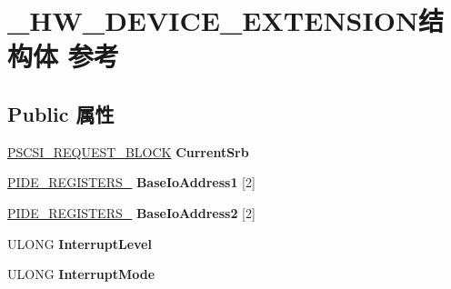 \hypertarget{struct___h_w___d_e_v_i_c_e___e_x_t_e_n_s_i_o_n}{}\section{\+\_\+\+H\+W\+\_\+\+D\+E\+V\+I\+C\+E\+\_\+\+E\+X\+T\+E\+N\+S\+I\+O\+N结构体 参考}
\label{struct___h_w___d_e_v_i_c_e___e_x_t_e_n_s_i_o_n}
\subsection*{Public 属性}
\begin{DoxyCompactItemize}
\item 
\mbox{\label{struct___h_w___d_e_v_i_c_e___e_x_t_e_n_s_i_o_n_ab1695c675fad5bf8e40a7574333e951c}} 
\hyperlink{struct___s_c_s_i___r_e_q_u_e_s_t___b_l_o_c_k}{P\+S\+C\+S\+I\+\_\+\+R\+E\+Q\+U\+E\+S\+T\+\_\+\+B\+L\+O\+CK} {\bfseries Current\+Srb}
\item 
\mbox{\label{struct___h_w___d_e_v_i_c_e___e_x_t_e_n_s_i_o_n_ab90cb10cacc6bbfa80abfa6fde58784f}} 
\hyperlink{struct___i_d_e___r_e_g_i_s_t_e_r_s__1}{P\+I\+D\+E\+\_\+\+R\+E\+G\+I\+S\+T\+E\+R\+S\+\_} {\bfseries Base\+Io\+Address1} \mbox{[}2\mbox{]}
\item 
\mbox{\label{struct___h_w___d_e_v_i_c_e___e_x_t_e_n_s_i_o_n_a91ca693b4bd4d0bbbcce619dc97ac1b4}} 
\hyperlink{struct___i_d_e___r_e_g_i_s_t_e_r_s__2}{P\+I\+D\+E\+\_\+\+R\+E\+G\+I\+S\+T\+E\+R\+S\+\_} {\bfseries Base\+Io\+Address2} \mbox{[}2\mbox{]}
\item 
\mbox{\label{struct___h_w___d_e_v_i_c_e___e_x_t_e_n_s_i_o_n_a55d2565b3254fe5676f7d7b1bd4b897c}} 
U\+L\+O\+NG {\bfseries Interrupt\+Level}
\item 
\mbox{\label{struct___h_w___d_e_v_i_c_e___e_x_t_e_n_s_i_o_n_aa509c338f4f9829b9eb972a413266b60}} 
U\+L\+O\+NG {\bfseries Interrupt\+Mode}
\item 
\mbox{\label{struct___h_w___d_e_v_i_c_e___e_x_t_e_n_s_i_o_n_a884ef1e6397161ec26321d1b9d32df6b}} 

\end{DoxyCompactItemize}
